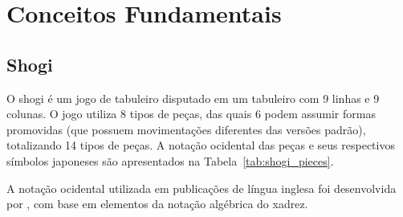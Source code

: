 
\chapter{Conceitos Fundamentais}
\label{cap:conceitos}

\section[Shogi]{Shogi}
    O shogi é um jogo de tabuleiro disputado em um tabuleiro com 9 linhas e 9 colunas. O jogo utiliza 8 tipos de peças, das quais 6 podem assumir formas promovidas (que possuem movimentações diferentes das versões padrão), totalizando 14 tipos de peças. A notação ocidental das peças e seus respectivos símbolos japoneses são apresentados na Tabela~\ref{tab:shogi_pieces}.

    A notação ocidental utilizada em publicações de língua inglesa foi desenvolvida por \cite{hodges-notation}, com base em elementos da notação algébrica do xadrez. 
